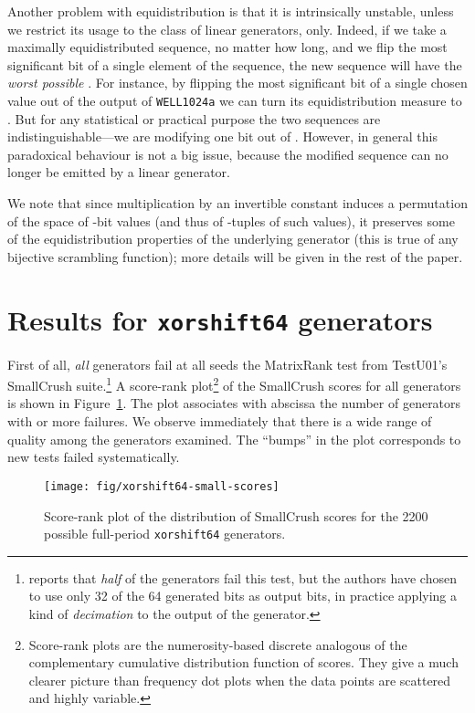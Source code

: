 \documentclass{acmsmalltr}
\newcommand{\xorshift}[1][]{\texttt{xorshift#1}\xspace}
\newcommand{\wella}{\texttt{WELL1024a}\xspace}
\begin{document}
Another problem with equidistribution is that it is intrinsically unstable,
unless we restrict its usage to the class of linear generators,
only.
Indeed, if we take a maximally equidistributed sequence, no matter how long,
and we flip the most significant bit of a single element of the sequence, the new sequence
will have the \emph{worst possible} .
For instance, by flipping the most significant bit of a single chosen value out
of the output of \wella we can turn its equidistribution measure to
. But for any statistical or practical purpose the two sequences
are indistinguishable---we are modifying one bit out of .
However, in general this paradoxical behaviour is not a big issue, because the
modified sequence can no longer be emitted by a linear generator.



We note that since multiplication by an invertible constant induces a
permutation of the space of -bit values (and thus of -tuples of such
values), it preserves some of the equidistribution properties of
the underlying generator (this is true of any bijective scrambling function);
more details will be given in the rest of the paper.

\section{Results for \xorshift[64] generators}
\label{sec:resxorshift}

First of all, \emph{all} generators fail at all seeds the
MatrixRank test from TestU01's SmallCrush suite.\footnote{ reports that \emph{half} of
the generators fail this test, but the authors have chosen to use only 32 of
the 64 generated bits as output bits, in practice applying a kind of \emph{decimation}
to the output of the generator.}
A score-rank plot\footnote{Score-rank plots
are the numerosity-based discrete analogous of the complementary cumulative
distribution function of scores.
They give a much clearer picture than frequency dot plots when the data points are scattered and highly variable.} of the SmallCrush scores for all generators is shown in
Figure~\ref{fig:xorshiftsmallscores}. The plot associates with abscissa  the
number of generators with  or more failures.
We observe immediately that there is a wide range of quality among the
generators examined.
The ``bumps'' in the plot corresponds to new tests failed systematically.

\begin{figure}
\centering
\texttt{[image: fig/xorshift64-small-scores]}
\caption{\label{fig:xorshiftsmallscores}Score-rank plot of the distribution
of SmallCrush scores for the 2200 possible full-period \xorshift[64] generators.}
\end{figure}
\end{document}
